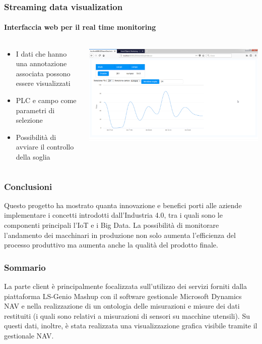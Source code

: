 \documentclass{beamer}
\begin{document}
\begin{frame}
\frametitle{Streaming data visualization}
\framesubtitle{Interfaccia web per il real time monitoring}
\begin{columns}[T] %
	\begin{column}{.3\textwidth}
		\begin{itemize}
			\small
			\item I dati che hanno una annotazione associata possono essere visualizzati
			\item PLC e campo come parametri di selezione
			\item Possibilità di avviare il controllo della soglia
		\end{itemize}
	\end{column}%
	\hfill%
	\begin{column}{.66\textwidth}
		\includegraphics[width=1\textwidth]{images/grafico-zk.png}
	\end{column}%
\end{columns}

\end{frame}

\begin{frame}
	\frametitle{Conclusioni}
	Questo progetto ha mostrato quanta innovazione e benefici porti alle aziende implementare i concetti introdotti dall’Industria 4.0, tra i quali sono le componenti principali l'IoT e i Big Data. La possibilità di monitorare l'andamento dei macchinari in produzione non solo aumenta l'efficienza del processo produttivo ma aumenta anche la qualità del prodotto finale.
\end{frame}

\begin{frame}
\frametitle{Sommario}
La parte client è principalmente focalizzata sull’utilizzo dei servizi forniti dalla piattaforma LS-Genio Mashup con il software gestionale Microsoft Dynamics NAV e nella realizzazione di un ontologia delle misurazioni e misure dei dati restituiti (i quali sono relativi a misurazioni di sensori su macchine utensili). Su questi dati, inoltre, è stata realizzata una visualizzazione grafica visibile tramite il gestionale NAV.
\end{frame}
\end{document}
